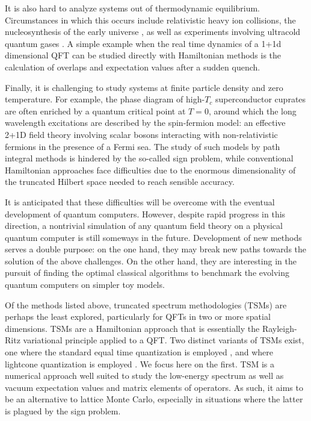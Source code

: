 \documentclass[twocolumn,secnumarabic,amssymb, nobibnotes, aps, prd]{revtex4-2}
\begin{document}
It is also hard to analyze systems out of thermodynamic equilibrium. Circumstances in which this occurs include relativistic heavy ion collisions, the nucleosynthesis of the early universe \cite{Berges:2015kfa}, as well as experiments involving ultracold quantum gases \cite{Kinoshita2006,Hofferberth2007}. A simple example when the real time dynamics of a 1+1d dimensional QFT can be studied directly with Hamiltonian methods is the calculation of overlaps and expectation values after a sudden quench\cite{Rakovszky:2016ugs,Horvath:2017wzf,Hodsagi:2018sul,Hodsagi:2019rcs,PhysRevLett.122.130603,Hodsagi:2020dqq,Horvath:2021vlx,Szasz-Schagrin:2021lal,Szasz-Schagrin:2022wkk}.

Finally, it is challenging to study systems at finite particle density and zero temperature. For example, the phase diagram of high-$T_c$ superconductor cuprates are often enriched by a quantum critical point at $T=0$, around which the long wavelength excitations are described by the spin-fermion model: an effective 2+1D field theory involving scalar bosons interacting with non-relativistic fermions in the presence of a Fermi sea. 
The study of such models by path integral methods is hindered by the so-called sign problem, while conventional Hamiltonian approaches face difficulties due to the enormous dimensionality of the truncated Hilbert space needed to reach sensible accuracy.

It is anticipated \cite{Jordan:2011ci,Jordan:2012xnu} that these difficulties will be overcome with the eventual development of quantum computers. However, despite rapid progress in this direction, a nontrivial simulation of any quantum field theory on a physical quantum computer is still someways in the future. Development of new methods serves a double purpose: on the one hand, they may break new paths towards the solution of the above challenges. On the other hand, they are interesting in the pursuit of finding the optimal classical algorithms to benchmark the evolving quantum computers on simpler toy models.

Of the methods listed above, truncated spectrum methodologies (TSMs) are perhaps the least explored, particularly for QFTs in two or more spatial dimensions.  
TSMs are a Hamiltonian approach that is essentially the Rayleigh-Ritz variational principle applied to a QFT. Two distinct variants of TSMs exist, one where the standard equal time quantization is employed \cite{yurov1990truncated,James:2017cpc}, and where lightcone quantization is employed \cite{Katz:2016hxp,anand2020introduction}.
We focus here on the first. TSM is a numerical approach well suited to study the low-energy spectrum as well as vacuum expectation values and matrix elements of operators. As such, it aims to be an alternative to lattice Monte Carlo, especially in situations where the latter is plagued by the sign problem. 
\end{document}
